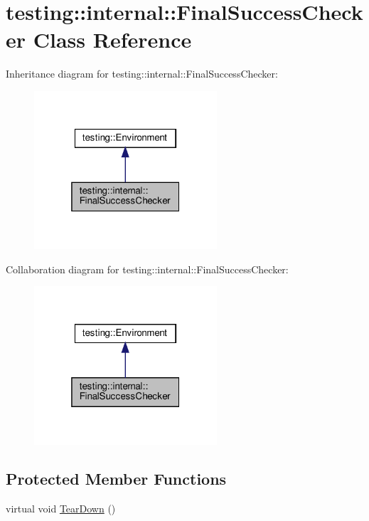 \hypertarget{classtesting_1_1internal_1_1_final_success_checker}{}\section{testing\+:\+:internal\+:\+:Final\+Success\+Checker Class Reference}
\label{classtesting_1_1internal_1_1_final_success_checker}


Inheritance diagram for testing\+:\+:internal\+:\+:Final\+Success\+Checker\+:
\nopagebreak
\begin{figure}[H]
\begin{center}
\leavevmode
\includegraphics[width=193pt]{classtesting_1_1internal_1_1_final_success_checker__inherit__graph}
\end{center}
\end{figure}


Collaboration diagram for testing\+:\+:internal\+:\+:Final\+Success\+Checker\+:
\nopagebreak
\begin{figure}[H]
\begin{center}
\leavevmode
\includegraphics[width=193pt]{classtesting_1_1internal_1_1_final_success_checker__coll__graph}
\end{center}
\end{figure}
\subsection*{Protected Member Functions}
\begin{DoxyCompactItemize}
\item 
virtual void \hyperlink{classtesting_1_1internal_1_1_final_success_checker_a8f39d12a1f2bfe8c6c04b5c6749382c9}{Tear\+Down} ()
\end{DoxyCompactItemize}
